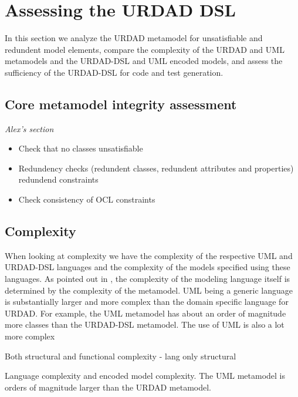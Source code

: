 \section{Assessing the URDAD DSL \label{sec:assessment}}

In this section we analyze the URDAD metamodel for unsatisfiable and redundent model elements, compare the complexity of the URDAD and UML metamodels and the URDAD-DSL and UML encoded models, and assess the sufficiency of the URDAD-DSL for code and test generation.


\subsection{Core metamodel integrity assessment}

\emph{Alex's section}


\begin{itemize}
  \item Check that no classes unsatisfiable
  \item Redundency checks (redundent classes, redundent attributes and properties) redundend constraints
  \item Check consistency of OCL constraints
\end{itemize}


\subsection{Complexity}

When looking at complexity we have the complexity of the respective UML and URDAD-DSL languages and the complexity of the models specified using these languages. As pointed out in \cite{mohagheghi_evaluating_2007}, the complexity of the modeling language itself is determined by the complexity of the metamodel. UML being a generic language is substantially larger and more complex than the domain specific language for URDAD. For example, the UML metamodel has about an order of magnitude more classes than the URDAD-DSL metamodel. The use of UML is also a lot more complex


Both structural and functional complexity - lang only structural


Language complexity and encoded model complexity. The UML metamodel is orders of magnitude larger than the URDAD metamodel. 


